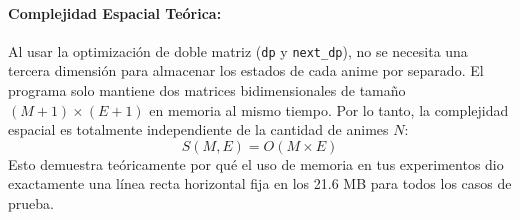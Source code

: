 \paragraph{Complejidad Espacial Teórica:}
Al usar la optimización de doble matriz (\texttt{dp} y \texttt{next\_dp}), no se necesita una tercera dimensión para almacenar los estados de cada anime por separado. El programa solo mantiene dos matrices bidimensionales de tamaño $(M+1) \times (E+1)$ en memoria al mismo tiempo. Por lo tanto, la complejidad espacial es totalmente independiente de la cantidad de animes $N$:
\begin{equation}
S(M, E) = O(M \times E)
\end{equation}
Esto demuestra teóricamente por qué el uso de memoria en tus experimentos dio exactamente una línea recta horizontal fija en los 21.6 MB para todos los casos de prueba.